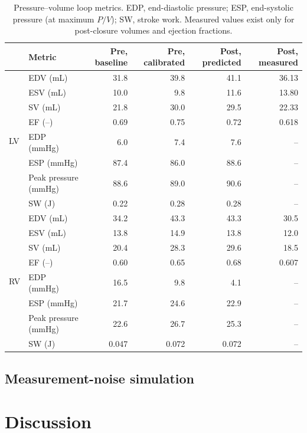 \documentclass{article}
\begin{document}
\begin{table}[!htbp]
\centering\small
\setlength{\tabcolsep}{4pt}
\caption{Pressure--volume loop metrics. EDP, end-diastolic pressure; ESP, end-systolic pressure (at maximum $P/V$); SW, stroke work. Measured values exist only for post-closure volumes and ejection fractions.}
\label{tab:pv}
\begin{tabular}{llrrrr}
\toprule
& \textbf{Metric} & \textbf{Pre, baseline} & \textbf{Pre, calibrated} & \textbf{Post, predicted} & \textbf{Post, measured} \\
\midrule
\multirow{8}{*}{LV}
& EDV (mL) & 31.8 & 39.8 & 41.1 & 36.13 \\
& ESV (mL) & 10.0 & 9.8 & 11.6 & 13.80 \\
& SV (mL) & 21.8 & 30.0 & 29.5 & 22.33 \\
& EF (--) & 0.69 & 0.75 & 0.72 & 0.618 \\
& EDP (mmHg) & 6.0 & 7.4 & 7.6 & -- \\
& ESP (mmHg) & 87.4 & 86.0 & 88.6 & -- \\
& Peak pressure (mmHg) & 88.6 & 89.0 & 90.6 & -- \\
& SW (J) & 0.22 & 0.28 & 0.28 & -- \\
\midrule
\multirow{8}{*}{RV}
& EDV (mL) & 34.2 & 43.3 & 43.3 & 30.5 \\
& ESV (mL) & 13.8 & 14.9 & 13.8 & 12.0 \\
& SV (mL) & 20.4 & 28.3 & 29.6 & 18.5 \\
& EF (--) & 0.60 & 0.65 & 0.68 & 0.607 \\
& EDP (mmHg) & 16.5 & 9.8 & 4.1 & -- \\
& ESP (mmHg) & 21.7 & 24.6 & 22.9 & -- \\
& Peak pressure (mmHg) & 22.6 & 26.7 & 25.3 & -- \\
& SW (J) & 0.047 & 0.072 & 0.072 & -- \\
\bottomrule
\end{tabular}
\end{table}

\FloatBarrier
\subsection{Measurement-noise simulation}
\label{sec:results_noise}



\FloatBarrier
\section{Discussion}
\label{sec:discussion}
\end{document}
